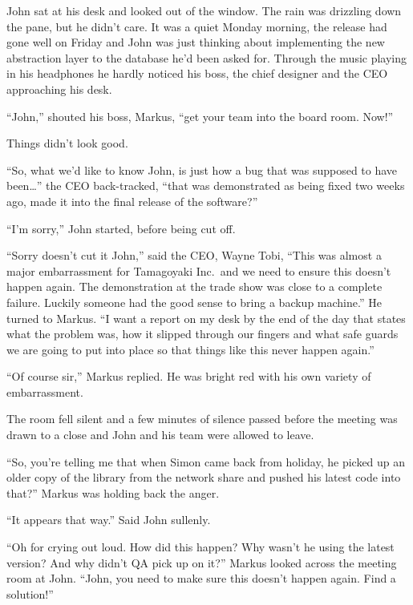 \begin{trenches}
John sat at his desk and looked out of the window.
The rain was drizzling down the pane, but he didn't care.
It was a quiet Monday morning, the release had gone well on Friday and John was just thinking about implementing the new abstraction layer to the database he'd been asked for.
Through the music playing in his headphones he hardly noticed his boss, the chief designer and the CEO approaching his desk.

``John,'' shouted his boss, Markus, ``get your team into the board room. Now!''

Things didn't look good.

\thoughtbreak

``So, what we'd like to know John, is just how a bug that was supposed to have been\ldots'' the CEO back-tracked, ``that was demonstrated as being fixed two weeks ago, made it into the final release of the software?''

``I'm sorry,'' John started, before being cut off.

``Sorry doesn't cut it John,'' said the CEO, Wayne Tobi,
``This was almost a major embarrassment for Tamagoyaki Inc.\ and we need to ensure this doesn't happen again. The demonstration at the trade show was close to a complete failure. Luckily someone had the good sense to bring a backup machine.''
He turned to Markus.
``I want a report on my desk by the end of the day that states what the problem was, how it slipped through our fingers and what safe guards we are going to put into place so that things like this never happen again.''

``Of course sir,'' Markus replied.
He was bright red with his own variety of embarrassment.

The room fell silent and a few minutes of silence passed before the meeting was drawn to a close and John and his team were allowed to leave.

\thoughtbreak

``So, you're telling me that when Simon came back from holiday, he picked up an older copy of the library from the network share and pushed his latest code into that?'' Markus was holding back the anger.

``It appears that way.'' Said John sullenly.

``Oh for crying out loud. How did this happen? Why wasn't he using the latest version? And why didn't QA pick up on it?'' Markus looked across the meeting room at John.
``John, you need to make sure this doesn't happen again. Find a solution!''
\end{trenches}


